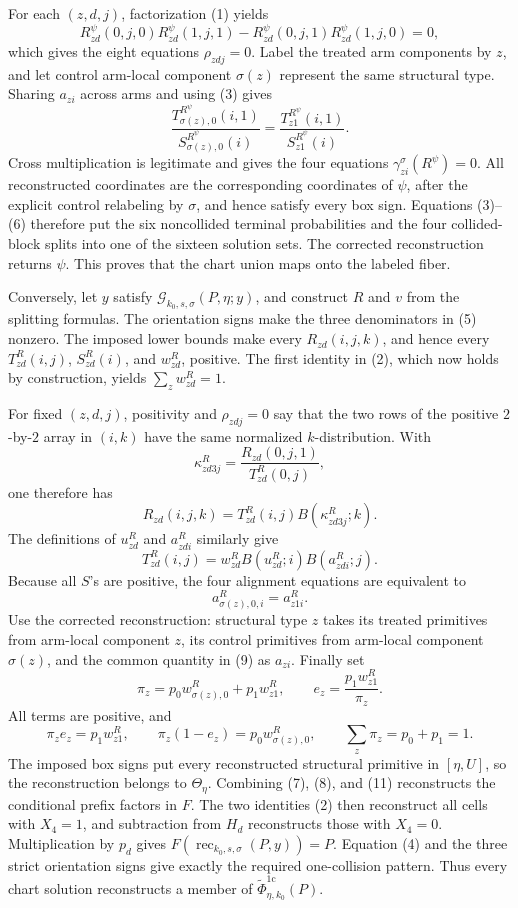 For each \((z,d,j)\), factorization (1) yields
\[
 R_{zd}^{\psi}(0,j,0)R_{zd}^{\psi}(1,j,1)
 -R_{zd}^{\psi}(0,j,1)R_{zd}^{\psi}(1,j,0)=0,
 \tag{6}
\]
which gives the eight equations \(\rho_{zdj}=0\).  Label the treated arm components by \(z\), and let control arm-local component \(\sigma(z)\) represent the same structural type.  Sharing \(a_{zi}\) across arms and using (3) gives
\[
 \frac{T_{\sigma(z),0}^{R^{\psi}}(i,1)}{S_{\sigma(z),0}^{R^{\psi}}(i)}
 =\frac{T_{z1}^{R^{\psi}}(i,1)}{S_{z1}^{R^{\psi}}(i)}.
\]
Cross multiplication is legitimate and gives the four equations \(\gamma_{zi}^{\sigma}(R^{\psi})=0\).  All reconstructed coordinates are the corresponding coordinates of \(\psi\), after the explicit control relabeling by \(\sigma\), and hence satisfy every box sign.  Equations (3)--(6) therefore put the six noncollided terminal probabilities and the four collided-block splits into one of the sixteen solution sets.  The corrected reconstruction returns \(\psi\).  This proves that the chart union maps onto the labeled fiber.

Conversely, let \(y\) satisfy \(\mathscr G_{k_0,s,\sigma}(P,\eta;y)\), and construct \(R\) and \(v\) from the splitting formulas.  The orientation signs make the three denominators in (5) nonzero.  The imposed lower bounds make every \(R_{zd}(i,j,k)\), and hence every \(T_{zd}^{R}(i,j)\), \(S_{zd}^{R}(i)\), and \(w_{zd}^{R}\), positive.  The first identity in (2), which now holds by construction, yields \(\sum_z w_{zd}^{R}=1\).

For fixed \((z,d,j)\), positivity and \(\rho_{zdj}=0\) say that the two rows of the positive \(2\)-by-\(2\) array in \((i,k)\) have the same normalized \(k\)-distribution.  With
\[
 \kappa_{zd3j}^{R}=\frac{R_{zd}(0,j,1)}{T_{zd}^{R}(0,j)},
\]
one therefore has
\[
 R_{zd}(i,j,k)=T_{zd}^{R}(i,j)B(\kappa_{zd3j}^{R};k).
 \tag{7}
\]
The definitions of \(u_{zd}^{R}\) and \(a_{zdi}^{R}\) similarly give
\[
 T_{zd}^{R}(i,j)=w_{zd}^{R}B(u_{zd}^{R};i)B(a_{zdi}^{R};j).
 \tag{8}
\]
Because all \(S\)'s are positive, the four alignment equations are equivalent to
\[
 a_{\sigma(z),0,i}^{R}=a_{z1i}^{R}.
 \tag{9}
\]
Use the corrected reconstruction: structural type \(z\) takes its treated primitives from arm-local component \(z\), its control primitives from arm-local component \(\sigma(z)\), and the common quantity in (9) as \(a_{zi}\).  Finally set
\[
 \pi_z=p_0w_{\sigma(z),0}^{R}+p_1w_{z1}^{R},
 \qquad e_z=\frac{p_1w_{z1}^{R}}{\pi_z}.
 \tag{10}
\]
All terms are positive, and
\[
 \pi_ze_z=p_1w_{z1}^{R},\qquad
 \pi_z(1-e_z)=p_0w_{\sigma(z),0}^{R},\qquad
 \sum_z\pi_z=p_0+p_1=1.
 \tag{11}
\]
The imposed box signs put every reconstructed structural primitive in \([\eta,U]\), so the reconstruction belongs to \(\Theta_\eta\).  Combining (7), (8), and (11) reconstructs the conditional prefix factors in \(F\).  The two identities (2) then reconstruct all cells with \(X_4=1\), and subtraction from \(H_d\) reconstructs those with \(X_4=0\).  Multiplication by \(p_d\) gives \(F(\operatorname{rec}_{k_0,s,\sigma}(P,y))=P\).  Equation (4) and the three strict orientation signs give exactly the required one-collision pattern.  Thus every chart solution reconstructs a member of \(\widetilde\Phi_{\eta,k_0}^{1\mathrm c}(P)\).

